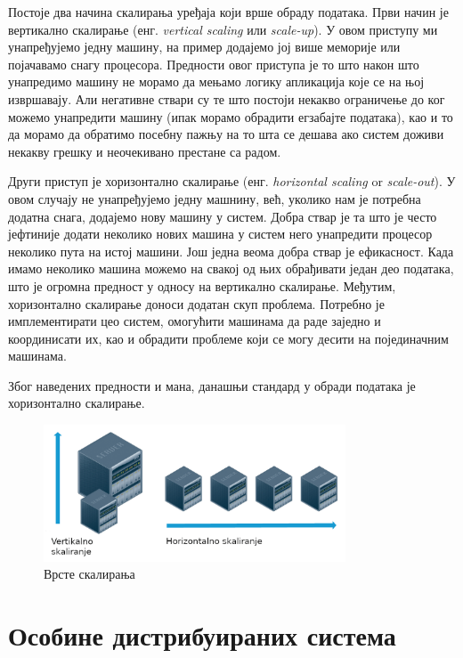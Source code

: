 \documentclass[12pt,oneside]{memoir}
\begin{document}
Постоје два начина скалирања уређаја који врше обраду података. Први начин је вертикално скалирање (енг. \textit{vertical scaling} или \textit{scale-up}). У овом приступу ми унапређујемо једну машину, на пример додајемо јој више меморије или појачавамо снагу процесора. Предности овог приступа је то што након што унапредимо машину не морамо да мењамо логику апликација које се на њој извршавају. Али негативне ствари су те што постоји некакво ограничење до ког можемо унапредити машину (ипак морамо обрадити егзабајте података), као и то да морамо да обратимо посебну пажњу на то шта се дешава ако систем доживи некакву грешку и неочекивано престане са радом. \cite{hadoop_beginner}

Други приступ је хоризонтално скалирање (енг. \textit{horizontal scaling} or \textit{scale-out}). У овом случају не унапређујемо једну машнину, већ, уколико нам је потребна додатна снага, додајемо нову машину у систем. Добра ствар је та што је често јефтиније додати неколико нових машина у систем него унапредити процесор неколико пута на истој машини. Још једна веома добра ствар је ефикасност. Када имамо неколико машина можемо на свакој од њих обрађивати један део података, што је огромна предност у односу на вертикално скалирање. Међутим, хоризонтално скалирање доноси додатан скуп проблема. Потребно је имплементирати цео систем, омогућити машинама да раде заједно и координисати их, као и обрадити проблеме који се могу десити на појединачним машинама. \cite{hadoop_beginner}

Због наведених предности и мана, данашњи стандард у обради података је хоризонтално скалирање.

\begin{figure}[!ht]
  \centering
  \includegraphics[width=0.8\textwidth]{pictures/scaling.png}
  \caption{Врсте скалирања}
  \label{fig:skaliranje}
\end{figure}

\section{Особине дистрибуираних система}
\label{sec:scaling_osobine}
\end{document}
